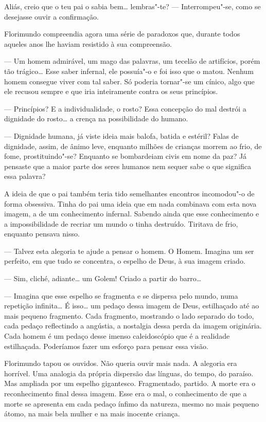 Aliás, creio que o teu pai o sabia bem\ldots{} lembras"-te? --- Interrompeu"-se,
como se desejasse ouvir a confirmação.

Florimundo compreendia agora uma série de paradoxos que, durante todos
aqueles anos lhe haviam resistido à sua compreensão.

--- Um homem admirável, um mago das palavras, um tecelão de artifícios,
porém tão trágico\ldots{} Esse saber infernal, ele possuía"-o e foi isso que o
matou. Nenhum homem consegue viver com tal saber. Só poderia tornar"-se
um cínico, algo que ele recusou sempre e que iria inteiramente contra os
seus princípios.

--- Princípios? E a individualidade, o rosto? Essa concepção do mal
destrói a dignidade do rosto\ldots{} a crença na possibilidade do humano.

--- Dignidade humana, já viste ideia mais balofa, batida e estéril? Falas
de dignidade, assim, de ânimo leve, enquanto milhões de crianças morrem
ao frio, de fome, prostituindo"-se? Enquanto se bombardeiam civis em nome
da paz? Já pensaste que a maior parte dos seres humanos nem sequer sabe
o que significa essa palavra?

A ideia de que o pai também teria tido semelhantes encontros incomodou"-o
de forma obsessiva. Tinha do pai uma ideia que em nada combinava com
esta nova imagem, a de um conhecimento infernal. Sabendo ainda que esse
conhecimento e a impossibilidade de recriar um mundo o tinha destruído.
Tiritava de frio, enquanto pensava nisso.

--- Talvez esta alegoria te ajude a pensar o homem. O Homem. Imagina um
ser perfeito, em que tudo se concentra, o espelho de Deus, à sua imagem
criado.

--- Sim, cliché, adiante\ldots{} um Golem! Criado a partir do barro\ldots{}

--- Imagina que esse espelho se fragmenta e se dispersa pelo mundo, numa
repetição infinita\ldots{} É isso\ldots{} um pedaço dessa imagem de Deus,
estilhaçado até ao mais pequeno fragmento. Cada fragmento, mostrando o
lado separado do todo, cada pedaço reflectindo a angústia, a nostalgia
dessa perda da imagem originária. Cada homem é um pedaço desse imenso
caleidoscópio que é a realidade estilhaçada. Poderíamos fazer um esforço
para pensar essa visão.

Florimundo tapou os ouvidos. Não queria ouvir mais nada. A alegoria era
horrível. Uma analogia da própria dispersão das línguas, do tempo, do
paraíso. Mas ampliada por um espelho gigantesco. Fragmentado, partido. A
morte era o reconhecimento final dessa imagem. Esse era o mal, o
conhecimento de que a morte se apresenta em cada pedaço ínfimo da
natureza, mesmo no mais pequeno átomo, na mais bela mulher e na mais
inocente criança.

